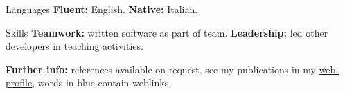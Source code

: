 
\begin{cvskills}

\cvskill
{Languages}
{\textbf{Fluent:} English. \textbf{Native:} Italian.}

\cvskill
{Skills}
{\textbf{Teamwork:} written software as part of team. \textbf{Leadership:} led 
other developers in teaching activities.}

\end{cvskills}

\vspace{-2mm}
\flushleft
\footnotesize
\item {\color{awesome-red}\textbf{Fur}}{\color{awesome-darknight}\textbf{ther 
info:}} references available on request, see my publications in my 
{\color{myblue}\href{https://www.ncl.ac.uk/engineering/staff/profile/alessandrode-gennaro.html}{web-profile}},
words in {\color{myblue}blue} contain weblinks.